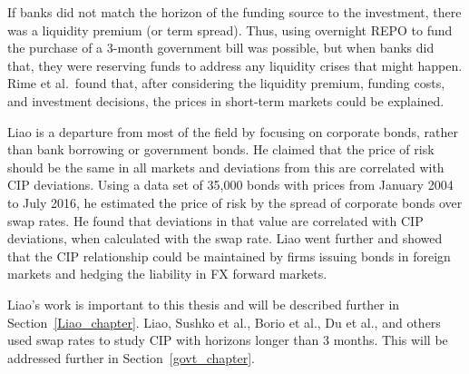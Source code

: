 If banks did not match the horizon of the funding source to the investment, there was a liquidity premium (or term spread).  Thus, using overnight REPO to fund the purchase of a 3-month government bill was possible, but when banks did that, they were reserving funds to address any liquidity crises that might happen.  Rime et al.\ found that, after considering the liquidity premium, funding costs, and investment decisions, the prices in short-term markets could be explained. 

Liao\cite{Liao2016} is a departure from most of the field by focusing on corporate bonds, rather than bank borrowing or government bonds.  He claimed that the price of risk should be the same in all markets and deviations from this are correlated with CIP deviations.  Using a data set of 35,000 bonds with prices from January 2004 to July 2016, he estimated the price of risk by the spread of corporate bonds over swap rates.  He found that deviations in that value are correlated with CIP deviations, when calculated with the swap rate.  Liao went further and showed that the CIP relationship could be maintained by firms issuing bonds in foreign markets and hedging the liability in FX forward markets.

Liao's work is important to this thesis and will be described further in Section~\ref{Liao_chapter}.  Liao, Sushko et al., Borio et al., Du et al., and others used swap rates to study CIP with horizons longer than 3 months.  This will be addressed further in Section~\ref{govt_chapter}.










